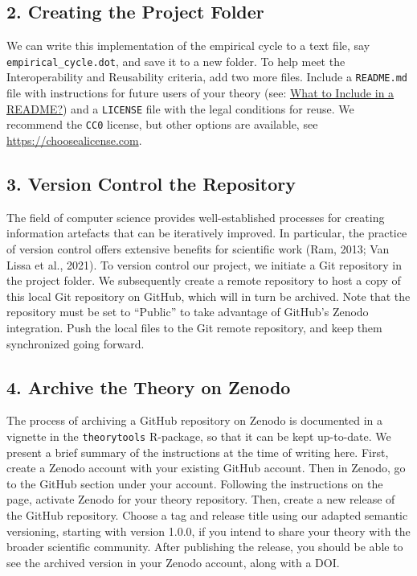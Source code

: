 \documentclass[
  man,floatsintext]{apa6}
\begin{document}
\subsection{2. Creating the Project Folder}\label{creating-the-project-folder}

We can write this implementation of the empirical cycle to a text file, say \texttt{empirical\_cycle.dot}, and save it to a new folder.
To help meet the Interoperability and Reusability criteria,
add two more files.
Include a \texttt{README.md} file with instructions for future users of your theory (see: \href{}{What to Include in a README?})
and a \texttt{LICENSE} file with the legal conditions for reuse.
We recommend the \texttt{CC0} license, but other options are available, see \href{https://choosealicense.com/non-software/}{https://choosealicense.com}.

\subsection{3. Version Control the Repository}\label{version-control-the-repository}

The field of computer science provides well-established processes for creating information artefacts that can be iteratively improved.
In particular, the practice of version control offers extensive benefits for scientific work (Ram, 2013; Van Lissa et al., 2021).
To version control our project, we initiate a Git repository in the project folder.
We subsequently create a remote repository to host a copy of this local Git repository on GitHub, which will in turn be archived.
Note that the repository
must be set to ``Public'' to take advantage of GitHub's Zenodo integration.
Push the local files to the Git remote repository, and keep them synchronized going forward.

\subsection{4. Archive the Theory on Zenodo}\label{archive-the-theory-on-zenodo}

The process of archiving a GitHub repository on Zenodo is documented in a vignette in the \texttt{theorytools} R-package, so that it can be kept up-to-date.
We present a brief summary of the instructions at the time of writing here.
First, create a Zenodo account with your existing GitHub account.
Then in Zenodo, go to the GitHub section under your account.
Following the instructions on the page, activate Zenodo for your theory repository.
Then, create a new release of the GitHub repository.
Choose a tag and release title using our adapted semantic versioning, starting with version 1.0.0, if you intend to share your theory with the broader scientific community.
After publishing the release,
you should be able to see the archived version in your Zenodo account,
along with a DOI.
\end{document}

